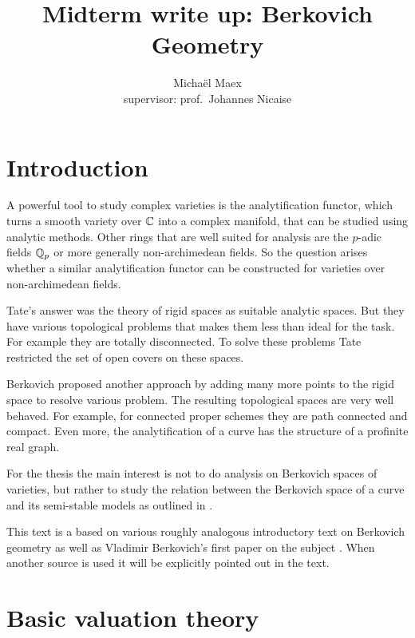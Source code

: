 \documentclass[a4paper]{article}
\title{Midterm write up: Berkovich Geometry}
\author{Michaël Maex\\ supervisor: prof.\ Johannes Nicaise}
\begin{document}
\maketitle

\tableofcontents



\todototoc
\listoftodos
\pagebreak


\section{Introduction} \label{sec:introduction}

A powerful tool to study complex varieties is the analytification functor, which turns a  smooth variety over $\mathbb{C}$ into a complex manifold, that can be studied using analytic methods. 
Other rings that are well suited for analysis are the $p$-adic fields $\mathbb{Q}_p$ or more generally non-archimedean fields. 
So the question arises whether a similar analytification functor can be constructed for  varieties over non-archimedean fields. 

Tate's answer was the theory of rigid spaces as suitable analytic spaces. 
But they have various topological problems that makes them less than ideal for the task. 
For example they are totally disconnected. To solve these problems Tate restricted the set of open covers on these spaces. 

Berkovich proposed another approach by adding many more points to the rigid space to resolve various problem. 
The resulting topological spaces are very well behaved. 
For example, for connected proper schemes they are path connected and compact. 
Even more, the analytification of a curve has the structure of a profinite real graph. 

For the thesis the main interest is not to do analysis on Berkovich spaces of varieties, but rather to study the relation between the Berkovich space of a curve and its semi-stable models as outlined in \cite{bakerStructureNonarchimedeanAnalytic2013}.

This text is a based on various roughly analogous introductory text on Berkovich geometry \cite{bakerarizona,temkinIntroductionBerkovichAnalytic2010,nicaiseNonarchimedeanGeometry2017,boschLecturesFormalRigid2014, wojciechwawrowBerkovicSpaces2020} as well as Vladimir Berkovich's first paper on the subject \cite{berkovichSpectralTheoryAnalytic2012}.
When another source is used it will be explicitly pointed out in the text. 

\section{Basic valuation theory} \label{sec:basic_valuation_theory}
\end{document}
